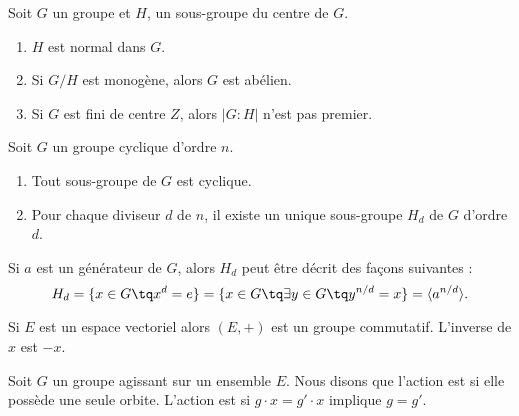 \begin{proposition}
    Soit \( G\) un groupe et \( H\), un sous-groupe du centre de \( G\).
    \begin{enumerate}
        \item
            \( H\) est normal dans \( G\).
        \item
            Si \( G/H\) est monogène, alors \( G\) est abélien.
        \item
            Si \( G\) est fini de centre \( Z\), alors \( | G:H |\) n'est pas premier.
    \end{enumerate}
\end{proposition}

\begin{theorem}
    Soit \( G\) un groupe cyclique d'ordre \( n\).
    \begin{enumerate}
        \item
            Tout sous-groupe de \( G\) est cyclique.
        \item 
            Pour chaque diviseur \( d\) de \( n\), il existe un unique sous-groupe \( H_d\) de \( G\) d'ordre \( d\).
    \end{enumerate}
    Si \( a\) est un générateur de \( G\), alors \( H_d\) peut être décrit des façons suivantes :
    \begin{equation}
        H_d=\{ x\in G\tq x^d=e \}=\{ x\in G\tq\exists y\in G\tq y^{n/d}=x \}=\langle a^{n/d}\rangle.
    \end{equation}
\end{theorem}

\begin{example}     \label{ExemMaKdwt}
    Si \( E\) est un espace vectoriel alors \( (E,+)\) est un groupe commutatif. L'inverse de \( x\) est \( -x\).
\end{example}

\begin{definition}
    Soit \( G\) un groupe agissant sur un ensemble \( E\). Nous disons que l'action est  si elle possède une seule orbite. L'action est  si \( g\cdot x=g'\cdot x\) implique \( g=g'\).
\end{definition}
